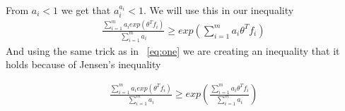 From $a_i < 1$ we get that $a_i^{a_i} < 1$. We will use this in our inequality\\
\begin{align*}
\frac{\displaystyle\sum_{i=1}^{m}a_i exp(\theta^T f_i)}{\displaystyle\sum_{i=1}^{m}a_i} \geq exp(\displaystyle\sum_{i=1}^{m}a_i\theta^T f_i)
\end{align*}
And using the same trick as in ~\ref{eq:one} we are creating an inequality that it holds because of Jensen's inequality

\begin{align}
\frac{\displaystyle\sum_{i=1}^{m}a_i exp(\theta^T f_i)}{\displaystyle\sum_{i=1}^{m}a_i} \geq exp(\frac{\displaystyle\sum_{i=1}^{m}a_i\theta^T f_i}{\displaystyle\sum_{i=1}^{m}a_i})
\end{align}

